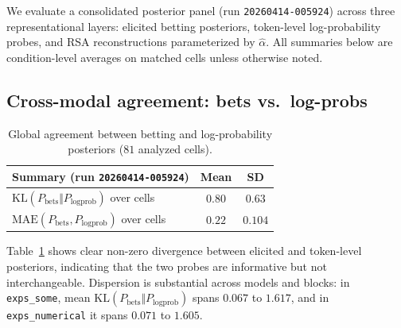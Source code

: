 \documentclass[11pt]{article}
\begin{document}
{\label{Results}

We evaluate a consolidated posterior panel (run \texttt{20260414-005924}) across three representational layers: elicited betting posteriors, token-level log-probability probes, and RSA reconstructions parameterized by $\hat\alpha$. All summaries below are condition-level averages on matched cells unless otherwise noted.

\subsection{Cross-modal agreement: bets vs.\ log-probs}

\begin{table}[t]

  \centering

  \footnotesize

  \setlength{\tabcolsep}{3pt}

  \renewcommand{\arraystretch}{0.92}

  \begin{tabularx}{\linewidth}{@{}Xcc@{}}

    \toprule

    Summary (run \texttt{20260414-005924}) & Mean & SD \\

    \midrule

    $\mathrm{KL}(P_{\text{bets}}\Vert P_{\text{logprob}})$ over cells & $0.80$ & $0.63$ \\

    $\mathrm{MAE}(P_{\text{bets}}, P_{\text{logprob}})$ over cells & $0.22$ & $0.104$ \\

    \bottomrule

  \end{tabularx}

  \caption{Global agreement between betting and log-probability posteriors ($81$ analyzed cells).}

  \label{tab:global}

\end{table}

Table~\ref{tab:global} shows clear non-zero divergence between elicited and token-level posteriors, indicating that the two probes are informative but not interchangeable. Dispersion is substantial across models and blocks: in \texttt{exps\_some}, mean $\mathrm{KL}(P_{\text{bets}}\Vert P_{\text{logprob}})$ spans $0.067$ to $1.617$, and in \texttt{exps\_numerical} it spans $0.071$ to $1.605$.

}
\end{document}
